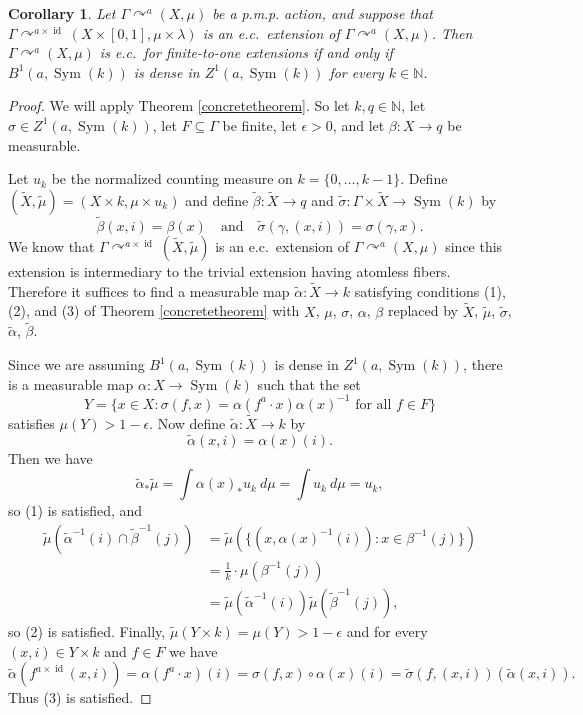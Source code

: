 \documentclass[12pt]{amsart}
\newtheorem{cor}[thm]{Corollary}
\theoremstyle{definition}
\def\bb{\mathbb}
\def\bb{\mathbb}
\DeclareMathOperator{\id}{id}
\newcommand{\pmp}{p{$.$}m{$.$}p{$.$}}
\newcommand{\acts}{\curvearrowright}
\begin{document}
\begin{cor} \label{cor:simple}
	Let $\Gamma \acts^a (X, \mu)$ be a {\pmp} action, and suppose that $\Gamma \acts^{a \times \id} (X \times [0,1], \mu \times \lambda)$ is an e.c.\ extension of $\Gamma \acts^a (X, \mu)$. Then $\Gamma \acts^a (X, \mu)$ is e.c.\ for finite-to-one extensions if and only if $B^1(a, \operatorname{Sym}(k))$ is dense in $Z^1(a, \operatorname{Sym}(k))$ for every $k \in \bb N$.
\end{cor}

\begin{proof}
	We will apply Theorem \ref{concretetheorem}. So let $k, q \in \bb N$, let $\sigma \in Z^1(a, \operatorname{Sym}(k))$, let $F \subseteq \Gamma$ be finite, let $\epsilon > 0$, and let $\beta : X \rightarrow q$ be measurable.
	
	Let $u_k$ be the normalized counting measure on $k = \{0, \ldots, k-1\}$. Define $(\tilde X, \tilde \mu) = (X \times k, \mu \times u_k)$ and define $\tilde \beta : \tilde X \rightarrow q$ and $\tilde \sigma : \Gamma \times \tilde X \rightarrow \operatorname{Sym}(k)$ by
	\[\tilde \beta(x,i) = \beta(x) \quad \text{and} \quad \tilde \sigma(\gamma, (x,i)) = \sigma(\gamma, x).\]
	We know that $\Gamma \acts^{a \times \id} (\tilde X, \tilde \mu)$ is an e.c.\ extension of $\Gamma \acts^a (X, \mu)$ since this extension is intermediary to the trivial extension having atomless fibers. Therefore it suffices to find a measurable map $\tilde \alpha : \tilde X \rightarrow k$ satisfying conditions (1), (2), and (3) of Theorem
	\ref{concretetheorem} with $X$, $\mu$, $\sigma$, $\alpha$, $\beta$ replaced by $\tilde X$, $\tilde \mu$, $\tilde \sigma$, $\tilde \alpha$, $\tilde \beta$.
	
	Since we are assuming $B^1(a, \operatorname{Sym}(k))$ is dense in $Z^1(a, \operatorname{Sym}(k))$, there is a measurable map $\alpha : X \rightarrow \operatorname{Sym}(k)$ such that the set
	\[Y = \{x \in X : \sigma(f, x) = \alpha(f^a \cdot x) \alpha(x)^{-1} \text{ for all } f \in F\}\]
	satisfies $\mu(Y) > 1 - \epsilon$. Now define $\tilde \alpha : \tilde X \rightarrow k$ by
	\[\tilde \alpha(x,i) = \alpha(x)(i).\]
	Then we have
	\[\tilde \alpha_* \tilde \mu = \int \alpha(x)_* u_k \ d \mu = \int u_k \ d \mu = u_k,\]
	so (1) is satisfied, and
	\begin{align*}
		\tilde \mu(\tilde \alpha^{-1}(i) \cap \tilde \beta^{-1}(j) ) & = \tilde \mu(\{(x, \alpha(x)^{-1}(i)) : x \in \beta^{-1}(j)\})\\
		& = \frac{1}{k} \cdot \mu(\beta^{-1}(j))\\
		& = \tilde \mu( \tilde \alpha^{-1}(i)) \tilde \mu (\tilde \beta^{-1}(j)),
	\end{align*}
	so (2) is satisfied. Finally, $\tilde \mu(Y \times k) = \mu(Y) > 1 - \epsilon$ and for every $(x,i) \in Y \times k$ and $f \in F$ we have
	\[\tilde \alpha(f^{a \times \id} (x,i)) = \alpha(f^a \cdot x)(i) = \sigma(f, x) \circ \alpha(x)(i) = \tilde \sigma(f, (x,i)) (\tilde \alpha(x,i)).\]
	Thus (3) is satisfied.
\end{proof}
\end{document}
